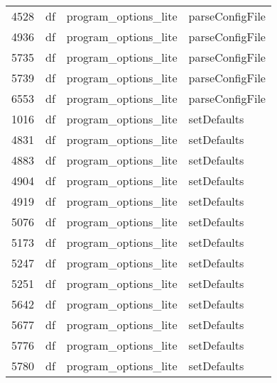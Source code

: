 \begin{tabular}{llll}
4528 &                    df &       program\_options\_lite &                           parseConfigFile \\
4936 &                    df &       program\_options\_lite &                           parseConfigFile \\
5735 &                    df &       program\_options\_lite &                           parseConfigFile \\
5739 &                    df &       program\_options\_lite &                           parseConfigFile \\
6553 &                    df &       program\_options\_lite &                           parseConfigFile \\
1016 &                    df &       program\_options\_lite &                               setDefaults \\
4831 &                    df &       program\_options\_lite &                               setDefaults \\
4883 &                    df &       program\_options\_lite &                               setDefaults \\
4904 &                    df &       program\_options\_lite &                               setDefaults \\
4919 &                    df &       program\_options\_lite &                               setDefaults \\
5076 &                    df &       program\_options\_lite &                               setDefaults \\
5173 &                    df &       program\_options\_lite &                               setDefaults \\
5247 &                    df &       program\_options\_lite &                               setDefaults \\
5251 &                    df &       program\_options\_lite &                               setDefaults \\
5642 &                    df &       program\_options\_lite &                               setDefaults \\
5677 &                    df &       program\_options\_lite &                               setDefaults \\
5776 &                    df &       program\_options\_lite &                               setDefaults \\
5780 &                    df &       program\_options\_lite &                               setDefaults \\

\end{tabular}
